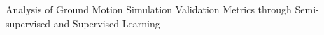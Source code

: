 % 
Analysis of Ground Motion Simulation Validation Metrics through Semi-supervised and Supervised Learning
% 
